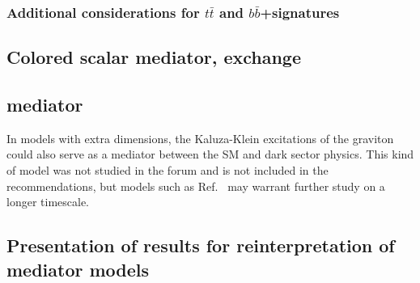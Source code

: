 \subsubsection{\texorpdfstring{Additional considerations for $t \bar{t}$ and $b \bar{b}$+\MET signatures}{Additional considerations for ttbar/bbbar+\MET signatures}}
\label{subsec:DMHFModels}


%
\subsection{Colored scalar mediator, \tchannel exchange}
\label{sec:monojet_t_channel}


\subsection{ \Spintwo mediator}
\label{sec:spintwo}

In models with extra dimensions, the Kaluza-Klein excitations of the graviton could also serve as a mediator between the SM and dark sector physics. This kind of model was not studied in the forum and is not included in the recommendations, but models such as Ref.~\cite{Lee:2013bua,Lee:2014caa} may warrant further study on a longer timescale. 




\subsection{Presentation of results for reinterpretation of \schannel mediator models}
\label{sec:monojet_scaling}

